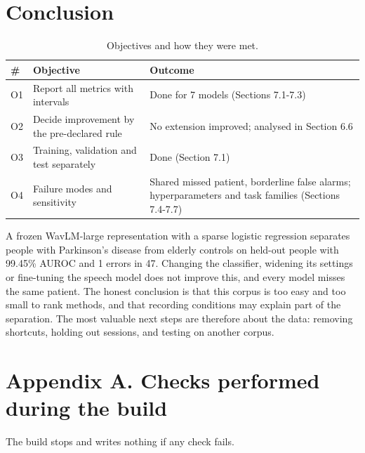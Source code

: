 \documentclass[11pt,a4paper]{article}
\begin{document}
\section{Conclusion}\label{sec:conclusion}
\begin{table}[H]\centering\footnotesize\renewcommand{\arraystretch}{1.15}
\caption{Objectives and how they were met.}
\begin{tabular}{lp{6cm}p{8.4cm}}
\toprule
\textbf{\#} & \textbf{Objective} & \textbf{Outcome}\\
\midrule
O1 & Report all metrics with intervals & Done for 7 models (Sections 7.1-7.3)\\
O2 & Decide improvement by the pre-declared rule & No extension improved; analysed in Section 6.6\\
O3 & Training, validation and test separately & Done (Section 7.1)\\
O4 & Failure modes and sensitivity & Shared missed patient, borderline false alarms; hyperparameters and task families (Sections 7.4-7.7)\\
\bottomrule
\end{tabular}\end{table}
A frozen WavLM-large representation with a sparse logistic regression separates people with Parkinson's disease from elderly controls on held-out people with 99.45\% AUROC and 1 errors in 47. Changing the classifier, widening its settings or fine-tuning the speech model does not improve this, and every model misses the same patient. The honest conclusion is that this corpus is too easy and too small to rank methods, and that recording conditions may explain part of the separation. The most valuable next steps are therefore about the data: removing shortcuts, holding out sessions, and testing on another corpus.

\section*{Appendix A. Checks performed during the build}
The build stops and writes nothing if any check fails.
\end{document}
